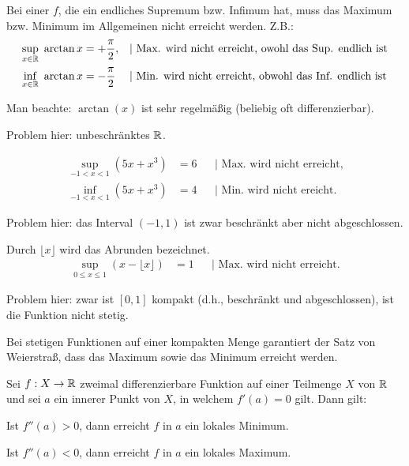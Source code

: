 \begin{bsp}
	Bei einer $f$, die ein endliches Supremum bzw. Infimum hat, muss das Maximum bzw. Minimum im Allgemeinen nicht erreicht werden. Z.B.:
	\begin{align*}
		\sup_{x \in \mathbb{R}} \  \arctan x &  = +\frac{\pi}{2},  & & |\text{ Max. wird nicht erreicht, owohl das Sup. endlich ist}
\\		\inf_{x \in \mathbb{R}} \ \arctan x & = -\frac{\pi}{2} & & |\text{ Min. wird nicht erreicht, obwohl das Inf. endlich ist}
	\end{align*}
	
	
	Man beachte: $\arctan(x)$ ist sehr regelmäßig (beliebig oft differenzierbar). 
	
	Problem hier: unbeschränktes $\mathbb{R}$. 
\end{bsp} 

\begin{bsp}
		\begin{align*}
			\sup_{-1 < x < 1} (5 x + x^3) & = 6  & & |\text{ Max. wird nicht erreicht,}
\\			\inf_{-1 < x < 1} (5  x+ x^3) & = 4 & & |\text{ Min. wird nicht ereicht.} 
		\end{align*}
		
		Problem hier: das Interval $(-1,1)$ ist zwar beschränkt aber nicht abgeschlossen. 
\end{bsp} 

\begin{bsp} 
		Durch $\lfloor x \rfloor$ wird das Abrunden bezeichnet. 
		\begin{align*}
			\sup_{0 \le x \le 1}  (x - \lfloor x \rfloor ) & = 1 & & |\text{ Max. wird nicht erreicht}. 
		\end{align*} 
		
		Problem hier: zwar ist $[0,1]$ kompakt (d.h., beschränkt und abgeschlossen), ist die Funktion nicht stetig. 
		
		Bei stetigen Funktionen auf einer kompakten Menge garantiert der Satz von Weierstraß, dass das Maximum sowie das Minimum erreicht werden. 
\end{bsp} 

\begin{thm} Sei $f : X \to \mathbb{R}$ zweimal differenzierbare Funktion auf einer Teilmenge $X$ von $\mathbb{R}$ und sei $a$ ein innerer Punkt von $X$, in welchem $f'(a) = 0$ gilt. Dann gilt: 
	\begin{enuma} 
		\item Ist $f''(a) > 0$, dann erreicht $f$ in $a$ ein lokales Minimum. 
		\item Ist $f''(a) < 0$, dann erreicht $f$ in $a$ ein lokales Maximum. 
	\end{enuma} 
\end{thm} 

